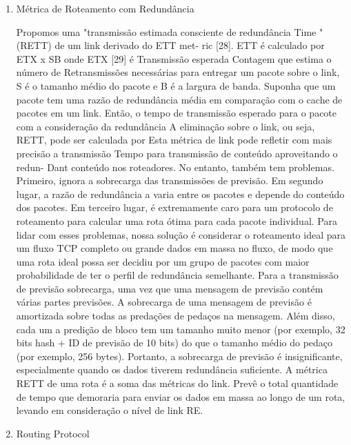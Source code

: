 \documentclass[12pt]{article}
\begin{document}
	\begin{enumerate}
		\item 
		Métrica de Roteamento com Redundância
		
		
		Propomos uma "transmissão estimada consciente de redundância
		Time "(RETT) de um link derivado do ETT met-
		ric [28]. ETT é calculado por ETX x SB onde ETX [29] é
		Transmissão esperada Contagem que estima o número de
		Retransmissões necessárias para entregar um pacote sobre o link, S é
		o tamanho médio do pacote e B é a largura de banda. Suponha que
		um pacote tem uma razão de redundância média em comparação com
		o cache de pacotes em um link. Então, o tempo de transmissão esperado para o pacote com a consideração da redundância
		A eliminação sobre o link, ou seja, RETT, pode ser calculada por
		Esta métrica de link pode refletir com mais precisão a transmissão
		Tempo para transmissão de conteúdo aproveitando o redun-
		Dant conteúdo nos roteadores. No entanto, também tem problemas.
		Primeiro, ignora a sobrecarga das transmissões de previsão.
		Em segundo lugar, a razão de redundância a varia entre os pacotes e
		depende do conteúdo dos pacotes. Em terceiro lugar, é extremamente
		caro para um protocolo de roteamento para calcular uma rota ótima
		para cada pacote individual. Para lidar com esses problemas, nossa solução
		é considerar o roteamento ideal para um fluxo TCP completo ou grande
		dados em massa no fluxo, de modo que uma rota ideal possa ser
		decidiu por um grupo de pacotes com maior probabilidade de ter
		o perfil de redundância semelhante. Para a transmissão de previsão
		sobrecarga, uma vez que uma mensagem de previsão contém várias partes
		previsões. A sobrecarga de uma mensagem de previsão é amortizada
		sobre todas as predações de pedaços na mensagem. Além disso, cada um
		a predição de bloco tem um tamanho muito menor (por exemplo, 32 bits hash +
		ID de previsão de 10 bits) do que o tamanho médio do pedaço (por exemplo, 256 bytes).
		Portanto, a sobrecarga de previsão é insignificante, especialmente
		quando os dados tiverem redundância suficiente. A métrica RETT
		de uma rota é a soma das métricas do link. Prevê o total
		quantidade de tempo que demoraria para enviar os dados em massa ao longo de um
		rota, levando em consideração o nível de link RE.
		
		\item Routing Protocol
		

\end{enumerate}
\end{document}
